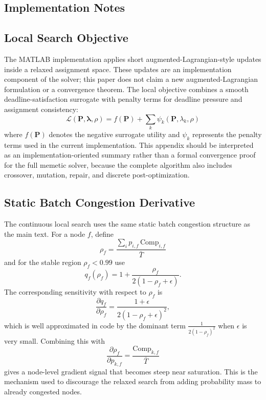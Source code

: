 \documentclass[pdflatex,sn-mathphys-num]{sn-jnl}
\begin{document}
\begin{appendices}
\section{Implementation Notes}

\subsection{Local Search Objective}
The MATLAB implementation applies short augmented-Lagrangian-style updates inside a relaxed assignment space. These updates are an implementation component of the solver; this paper does not claim a new augmented-Lagrangian formulation or a convergence theorem. The local objective combines a smooth deadline-satisfaction surrogate with penalty terms for deadline pressure and assignment consistency:
\begin{equation}
    \mathcal{L}(\mathbf{P}, \boldsymbol{\lambda}, \rho) =
    f(\mathbf{P}) + \sum_k \psi_k(\mathbf{P}, \lambda_k, \rho)
\end{equation}
where $f(\mathbf{P})$ denotes the negative surrogate utility and $\psi_k$ represents the penalty terms used in the current implementation. This appendix should be interpreted as an implementation-oriented summary rather than a formal convergence proof for the full memetic solver, because the complete algorithm also includes crossover, mutation, repair, and discrete post-optimization.

\subsection{Static Batch Congestion Derivative}
\label{appendix:gradients}
The continuous local search uses the same static batch congestion structure as the main text. For a node $f$, define
\begin{equation}
    \rho_f = \frac{\sum_i p_{i,f}\,\mathrm{Comp}_{i,f}}{\bar{T}}
\end{equation}
and for the stable region $\rho_f < 0.99$ use
\begin{equation}
    q_f(\rho_f) = 1 + \frac{\rho_f}{2(1-\rho_f+\epsilon)}.
\end{equation}
The corresponding sensitivity with respect to $\rho_f$ is
\begin{equation}
    \frac{\partial q_f}{\partial \rho_f}
    =
    \frac{1+\epsilon}{2(1-\rho_f+\epsilon)^2},
\end{equation}
which is well approximated in code by the dominant term $\frac{1}{2(1-\rho_f)^2}$ when $\epsilon$ is very small. Combining this with
\begin{equation}
    \frac{\partial \rho_f}{\partial p_{k,f}} = \frac{\mathrm{Comp}_{k,f}}{\bar{T}}
\end{equation}
gives a node-level gradient signal that becomes steep near saturation. This is the mechanism used to discourage the relaxed search from adding probability mass to already congested nodes.


\end{appendices}
\end{document}
